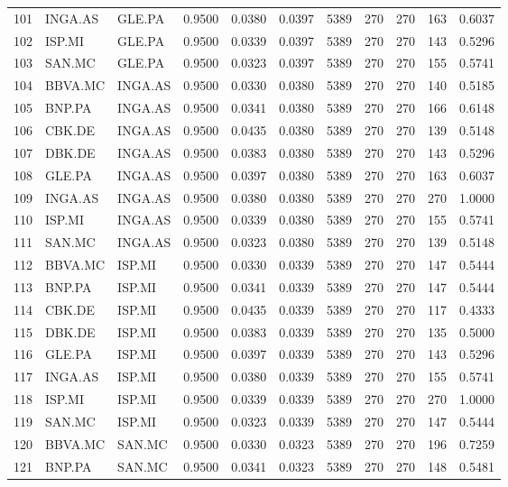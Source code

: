 \begin{table}
\begin{tabular}{lllrrrrrrrr}
101 & INGA.AS & GLE.PA & 0.9500 & 0.0380 & 0.0397 & 5389 & 270 & 270 & 163 & 0.6037 \\
102 & ISP.MI & GLE.PA & 0.9500 & 0.0339 & 0.0397 & 5389 & 270 & 270 & 143 & 0.5296 \\
103 & SAN.MC & GLE.PA & 0.9500 & 0.0323 & 0.0397 & 5389 & 270 & 270 & 155 & 0.5741 \\
104 & BBVA.MC & INGA.AS & 0.9500 & 0.0330 & 0.0380 & 5389 & 270 & 270 & 140 & 0.5185 \\
105 & BNP.PA & INGA.AS & 0.9500 & 0.0341 & 0.0380 & 5389 & 270 & 270 & 166 & 0.6148 \\
106 & CBK.DE & INGA.AS & 0.9500 & 0.0435 & 0.0380 & 5389 & 270 & 270 & 139 & 0.5148 \\
107 & DBK.DE & INGA.AS & 0.9500 & 0.0383 & 0.0380 & 5389 & 270 & 270 & 143 & 0.5296 \\
108 & GLE.PA & INGA.AS & 0.9500 & 0.0397 & 0.0380 & 5389 & 270 & 270 & 163 & 0.6037 \\
109 & INGA.AS & INGA.AS & 0.9500 & 0.0380 & 0.0380 & 5389 & 270 & 270 & 270 & 1.0000 \\
110 & ISP.MI & INGA.AS & 0.9500 & 0.0339 & 0.0380 & 5389 & 270 & 270 & 155 & 0.5741 \\
111 & SAN.MC & INGA.AS & 0.9500 & 0.0323 & 0.0380 & 5389 & 270 & 270 & 139 & 0.5148 \\
112 & BBVA.MC & ISP.MI & 0.9500 & 0.0330 & 0.0339 & 5389 & 270 & 270 & 147 & 0.5444 \\
113 & BNP.PA & ISP.MI & 0.9500 & 0.0341 & 0.0339 & 5389 & 270 & 270 & 147 & 0.5444 \\
114 & CBK.DE & ISP.MI & 0.9500 & 0.0435 & 0.0339 & 5389 & 270 & 270 & 117 & 0.4333 \\
115 & DBK.DE & ISP.MI & 0.9500 & 0.0383 & 0.0339 & 5389 & 270 & 270 & 135 & 0.5000 \\
116 & GLE.PA & ISP.MI & 0.9500 & 0.0397 & 0.0339 & 5389 & 270 & 270 & 143 & 0.5296 \\
117 & INGA.AS & ISP.MI & 0.9500 & 0.0380 & 0.0339 & 5389 & 270 & 270 & 155 & 0.5741 \\
118 & ISP.MI & ISP.MI & 0.9500 & 0.0339 & 0.0339 & 5389 & 270 & 270 & 270 & 1.0000 \\
119 & SAN.MC & ISP.MI & 0.9500 & 0.0323 & 0.0339 & 5389 & 270 & 270 & 147 & 0.5444 \\
120 & BBVA.MC & SAN.MC & 0.9500 & 0.0330 & 0.0323 & 5389 & 270 & 270 & 196 & 0.7259 \\
121 & BNP.PA & SAN.MC & 0.9500 & 0.0341 & 0.0323 & 5389 & 270 & 270 & 148 & 0.5481 \\

\end{tabular}
\end{table}
